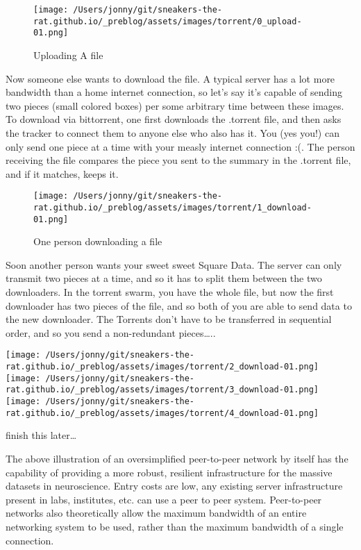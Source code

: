 \documentclass{article}
\begin{document}
\begin{figure}
\centering
\texttt{[image: /Users/jonny/git/sneakers-the-rat.github.io/\_preblog/assets/images/torrent/0\_upload-01.png]}
\caption{Uploading A file}
\end{figure}

Now someone else wants to download the file. A typical server has a lot
more bandwidth than a home internet connection, so let's say it's
capable of sending two pieces (small colored boxes) per some arbitrary
time between these images. To download via bittorrent, one first
downloads the .torrent file, and then asks the tracker to connect them
to anyone else who also has it. You (yes you!) can only send one piece
at a time with your measly internet connection :(. The person receiving
the file compares the piece you sent to the summary in the .torrent
file, and if it matches, keeps it.

\begin{figure}
\centering
\texttt{[image: /Users/jonny/git/sneakers-the-rat.github.io/\_preblog/assets/images/torrent/1\_download-01.png]}
\caption{One person downloading a file}
\end{figure}

Soon another person wants your sweet sweet Square Data. The server can
only transmit two pieces at a time, and so it has to split them between
the two downloaders. In the torrent swarm, you have the whole file, but
now the first downloader has two pieces of the file, and so both of you
are able to send data to the new downloader. The Torrents don't have to
be transferred in sequential order, and so you send a non-redundant
pieces\ldots..

\texttt{[image: /Users/jonny/git/sneakers-the-rat.github.io/\_preblog/assets/images/torrent/2\_download-01.png]}
\texttt{[image: /Users/jonny/git/sneakers-the-rat.github.io/\_preblog/assets/images/torrent/3\_download-01.png]}
\texttt{[image: /Users/jonny/git/sneakers-the-rat.github.io/\_preblog/assets/images/torrent/4\_download-01.png]}

finish this later\ldots{}

The above illustration of an oversimplified peer-to-peer network by
itself has the capability of providing a more robust, resilient
infrastructure for the massive datasets in neuroscience. Entry costs are
low, any existing server infrastructure present in labs, institutes,
etc. can use a peer to peer system. Peer-to-peer networks also
theoretically allow the maximum bandwidth of an entire networking system
to be used, rather than the maximum bandwidth of a single connection.
\end{document}
